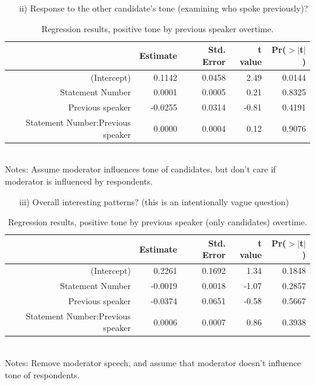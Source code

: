 \documentclass[12pt,letterpaper]{article}
\begin{document}
\begin{itemize}
\item[ii)] Response to the other candidate's tone (examining who spoke previously)?
\end{itemize}



\begin{table}[H]
\centering
  \caption{\footnotesize{Regression results, positive tone by previous speaker overtime.}}
\begin{tabular}{rrrrr}
  \hline
 & Estimate & Std. Error & t value & Pr($>$$|$t$|$) \\ 
  \hline
(Intercept) & 0.1142 & 0.0458 & 2.49 & 0.0144 \\ 
Statement Number & 0.0001 & 0.0005 & 0.21 & 0.8325 \\ 
Previous speaker & -0.0255 & 0.0314 & -0.81 & 0.4191 \\ 
  Statement Number:Previous speaker  & 0.0000 & 0.0004 & 0.12 & 0.9076 \\ 
   \hline
\end{tabular}\\
    \footnotesize{Notes: Assume moderator influences tone of candidates, but don't care if moderator is influenced by respondents.}
\end{table}

\begin{itemize}
\item[iii)] Overall interesting patterns? (this is an intentionally vague question)
\end{itemize}



\begin{table}[H]
\centering
  \caption{\footnotesize{Regression results, positive tone by previous speaker (only candidates) overtime.}}
\begin{tabular}{rrrrr}
  \hline
 & Estimate & Std. Error & t value & Pr($>$$|$t$|$) \\ 
  \hline
(Intercept) & 0.2261 & 0.1692 & 1.34 & 0.1848 \\ 
  Statement Number & -0.0019 & 0.0018 & -1.07 & 0.2857 \\ 
  Previous speaker & -0.0374 & 0.0651 & -0.58 & 0.5667 \\ 
  Statement Number:Previous speaker & 0.0006 & 0.0007 & 0.86 & 0.3938 \\ 
   \hline
\end{tabular}\\
    \footnotesize{Notes: Remove moderator speech, and assume that moderator doesn't influence tone of respondents.}
\end{table}
\end{document}
